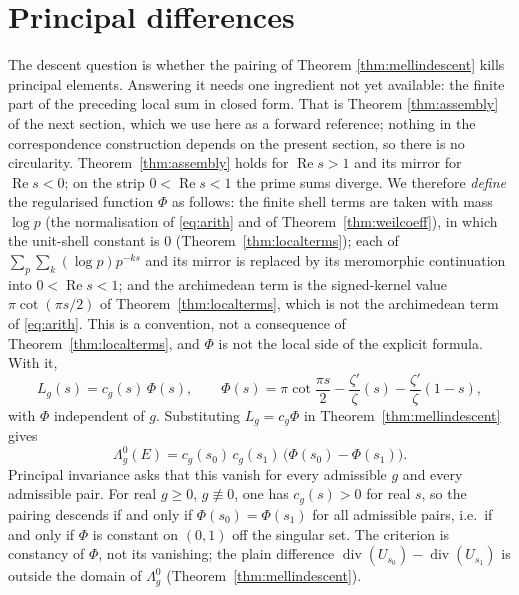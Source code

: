 \documentclass[11pt]{amsart}
\theoremstyle{definition}
\theoremstyle{remark}
\newcommand{\divv}{\operatorname{div}}
\newcommand{\Rel}{\operatorname{Re}}
\begin{document}
\section{Principal differences}
\label{sec:principaldiff}

The descent question is whether the pairing of Theorem \ref{thm:mellindescent}
kills principal elements.  Answering it needs one ingredient not yet
available: the finite part of the preceding local sum in closed form.  That
is Theorem \ref{thm:assembly} of the next section, which we use here as a
forward reference; nothing in the correspondence construction depends on the present section, so
there is no circularity.  Theorem~\ref{thm:assembly} holds for $\Rel s>1$
and its mirror for $\Rel s<0$; on the strip $0<\Rel s<1$ the prime sums
diverge.  We therefore \emph{define} the regularised function $\Phi$ as
follows: the finite shell terms are taken with mass $\log p$ (the
normalisation of \eqref{eq:arith} and of Theorem~\ref{thm:weilcoeff}), in
which the unit-shell constant is $0$ (Theorem~\ref{thm:localterms}); each of
$\sum_p\sum_k(\log p)p^{-ks}$ and its mirror is replaced by its meromorphic
continuation into $0<\Rel s<1$; and the archimedean term is the signed-kernel
value $\pi\cot(\pi s/2)$ of Theorem~\ref{thm:localterms}, which is not the
archimedean term of \eqref{eq:arith}.  This is a convention, not a
consequence of Theorem~\ref{thm:localterms}, and $\Phi$ is not the local side
of the explicit formula.  With it,
\begin{equation}\label{eq:Lg}
 L_g(s)=c_g(s)\,\Phi(s),
 \qquad
 \Phi(s)=\pi\cot\frac{\pi s}{2}-\frac{\zeta'}{\zeta}(s)
 -\frac{\zeta'}{\zeta}(1-s),
\end{equation}
with $\Phi$ independent of $g$.  Substituting $L_g=c_g\Phi$ in
Theorem~\ref{thm:mellindescent} gives
\begin{equation}\label{eq:principalpairvanishing}
 \Lambda_g^{0}(E)=c_g(s_0)\,c_g(s_1)\,\bigl(\Phi(s_0)-\Phi(s_1)\bigr).
\end{equation}
Principal invariance asks that this vanish for every admissible $g$ and every
admissible pair.  For real $g\ge0$, $g\not\equiv0$, one has $c_g(s)>0$ for
real $s$, so the pairing descends if and only if $\Phi(s_0)=\Phi(s_1)$ for all
admissible pairs, i.e.\ if and only if $\Phi$ is constant on $(0,1)$ off the
singular set.  The criterion is constancy of $\Phi$, not its vanishing; the
plain difference $\divv(U_{s_0})-\divv(U_{s_1})$ is outside the domain of
$\Lambda_g^0$ (Theorem~\ref{thm:mellindescent}).
\end{document}
